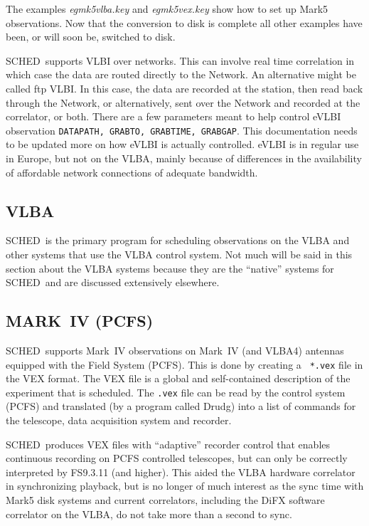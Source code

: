 \documentclass{report}
\newcommand{\schedb}{{\sc SCHED~}}
\begin{document}
The examples {\sl egmk5vlba.key} and {\sl egmk5vex.key} show how to
set up Mark5 observations.  Now that the conversion to disk is complete
all other examples have been, or will soon be, switched to disk.


\schedb supports VLBI over networks.  This can involve real time
correlation in which case the data are routed directly to the Network.
An alternative might be called ftp VLBI.  In this case, the data are
recorded at the station, then read back through the Network, or
alternatively, sent over the Network and recorded at the correlator,
or both.  There are a few parameters meant to help control eVLBI
observation {\tt DATAPATH, GRABTO, GRABTIME, GRABGAP}.  This
documentation needs to be updated more on how eVLBI is actually
controlled.  eVLBI is in regular use in Europe, but not on the VLBA,
mainly because of differences in the availability of affordable network
connections of adequate bandwidth.


\subsection{\label{SSEC:VLBA}VLBA}

\schedb is the primary program for scheduling observations on the VLBA
and other systems that use the VLBA control system.  Not much will be
said in this section about the VLBA systems because they are the
``native'' systems for \schedb and are discussed extensively elsewhere.


\subsection{\label{SSEC:MKIV}MARK~IV (PCFS)}

\schedb supports Mark~IV observations on Mark~IV (and VLBA4) antennas
equipped with the Field System (PCFS). This is done by creating a {\tt
*.vex} file in the VEX format. The VEX file is a global and
self-contained description of the experiment that is scheduled. The
{\tt *.vex} file can be read by the control system (PCFS) and
translated (by a program called {\sc Drudg}) into a list of commands
for the telescope, data acquisition system and recorder.

\schedb produces VEX files with ``adaptive'' recorder control that enables
continuous recording on PCFS controlled telescopes, but can only
be correctly interpreted by FS9.3.11 (and higher).  This aided the
VLBA hardware correlator in synchronizing playback, but is no longer
of much interest as the sync time with Mark5 disk systems and current
correlators, including the DiFX software correlator on the VLBA, do not
take more than a second to sync.
\end{document}
